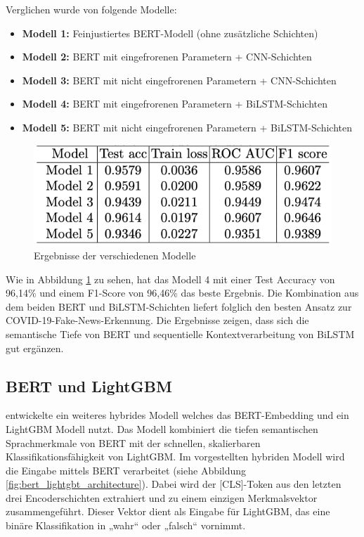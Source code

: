 Verglichen wurde von \cite{wang2021covid19fakenewsdetection} folgende Modelle:
\begin{itemize}
    \item \textbf{Modell 1:} Feinjustiertes BERT-Modell (ohne zusätzliche Schichten)
    \item \textbf{Modell 2:} BERT mit eingefrorenen Parametern + CNN-Schichten
    \item \textbf{Modell 3:} BERT mit nicht eingefrorenen Parametern + CNN-Schichten
    \item \textbf{Modell 4:} BERT mit eingefrorenen Parametern + BiLSTM-Schichten
    \item \textbf{Modell 5:} BERT mit nicht eingefrorenen Parametern + BiLSTM-Schichten
\end{itemize}

\begin{figure}[htbp]
    \begin{center}
    \includegraphics[scale=0.4]{static/bert_bilstm_results.png}
    \caption{\label{fig:bert_bilstm_results} Ergebnisse der verschiedenen Modelle \cite{wang2021covid19fakenewsdetection}}
    \end{center}
\end{figure}

Wie in Abbildung \ref{fig:bert_bilstm_results} zu sehen, hat das Modell 4 mit einer Test Accuracy von 96,14\% und einem F1-Score von 96,46\%
das beste Ergebnis.
Die Kombination aus dem beiden BERT und BiLSTM-Schichten liefert folglich den besten Ansatz zur COVID-19-Fake-News-Erkennung. 
Die Ergebnisse zeigen, dass sich die semantische Tiefe von BERT und sequentielle Kontextverarbeitung von BiLSTM gut ergänzen.

\subsection{BERT und LightGBM}
\label{sec:bert_lightgbm}

\cite{Essa:2023aa} entwickelte ein weiteres hybrides Modell welches das BERT-Embedding und ein LightGBM Modell nutzt.
Das Modell kombiniert die tiefen semantischen Sprachmerkmale von BERT mit der schnellen, skalierbaren Klassifikationsfähigkeit von LightGBM.
Im vorgestellten hybriden Modell wird die Eingabe mittels BERT verarbeitet (siehe Abbildung \ref{fig:bert_lightgbt_architecture}). 
Dabei wird der [CLS]-Token aus den letzten drei Encoderschichten extrahiert und zu einem einzigen Merkmalsvektor zusammengeführt. 
Dieser Vektor dient als Eingabe für LightGBM, das eine binäre Klassifikation in „wahr“ oder „falsch“ vornimmt.

